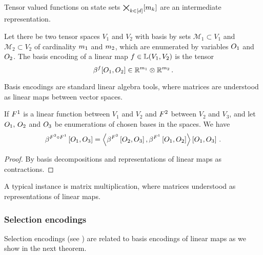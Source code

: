 Tensor valued functions on state sets $\bigtimes_{k\in[d]}[m_{k}]$ are an intermediate representation.

\begin{definition}
    Let there be two tensor spaces $V_1$ and $V_2$ with basis by sets $\mathcal{M}_1\subset V_1$ and $\mathcal{M}_2\subset V_2$ of cardinality $m_{1}$ and $m_{2}$, which are enumerated by variables $O_{1}$ and $O_{2}$.
    The basis encoding of a linear map $f\in\mathbb{L}(V_1,V_2)$ is the tensor
    \[ \beta^{f}[O_{1},O_{2}] \in \mathbb{R}^{m_{1}} \otimes \mathbb{R}^{m_{2}} \, . \]
\end{definition}

Basis encodings are standard linear algebra tools, where matrices are understood as linear maps between vector spaces.

\begin{theorem}
    \label{the:linearCompositionBasisEncoding}
    If $F^{1}$ is a linear function between $V_1$ and $V_2$  and $F^{2}$ between $V_2$ and $V_3$, and let $O_{1},\,O_{2}$ and $O_{3}$ be enumerations of chosen bases in the spaces.
    We have
    \begin{align*}
        \beta^{F^{2}\circ F^{1}}\left[O_{1},O_{3}\right]
        = \left\langle 
            \beta^{F^{2}}\left[O_{2},O_{3}\right], \beta^{F^{1}}\left[O_{1},O_{2}\right]
        \right\rangle \left[ O_{1},O_{3} \right]  \, .
    \end{align*}
\end{theorem}
\begin{proof}
    By basis decompositions and representations of linear maps as contractions.
\end{proof}

A typical instance is matrix multiplication, where matrices understood as representations of linear maps.

\subsubsection{Selection encodings}

Selection encodings (see ) are related to basis encodings of linear maps as we show in the next theorem.

